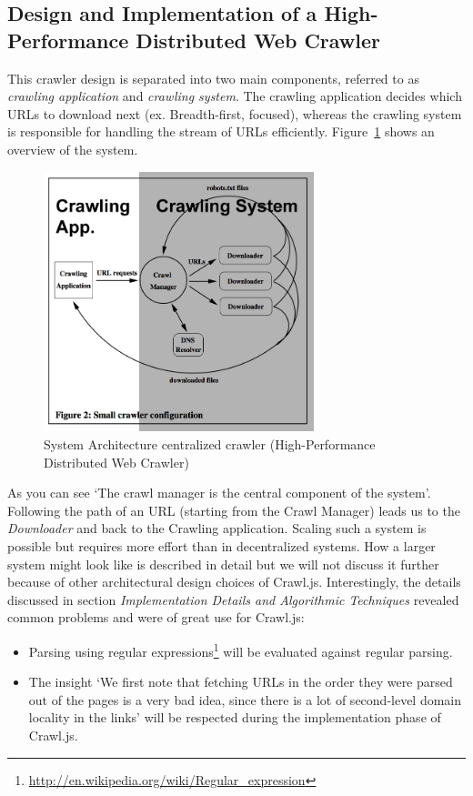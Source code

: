 \subsection{Design and Implementation of a High-Performance Distributed Web Crawler~\cite{hp_crawler}}
This crawler design is separated into two main components, referred to as \emph{crawling application} and \emph{crawling system}. The crawling application decides which URLs to download next (ex. Breadth-first, focused), whereas the crawling system is responsible for handling the stream of URLs efficiently. Figure~\ref{hp_crawler} shows an overview of the system.
\begin{figure}[h]
\centering
  \includegraphics[width=0.7\textwidth]{Figures/hp_crawler.png}
\caption{System Architecture centralized crawler (High-Performance Distributed Web Crawler)}
\label{hp_crawler}
\end{figure}
As you can see `The crawl manager is the central component of the system'. Following the path of an URL (starting from the Crawl Manager) leads us to the \emph{Downloader} and back to the Crawling application. Scaling such a system is possible but requires more effort than in decentralized systems. How a larger system might look like is described in detail but we will not discuss it further because of other architectural design choices of Crawl.js.
Interestingly, the details discussed in section \emph{Implementation Details and Algorithmic Techniques} revealed common problems and were of great use for Crawl.js:
\begin{itemize}
  \item Parsing using regular expressions\footnote{\url{http://en.wikipedia.org/wiki/Regular_expression}} will be evaluated against regular parsing.
  \item The insight `We first note that fetching URLs in the order they were parsed out of the pages is a very bad idea, since there is a lot of second-level domain locality in the links' will be respected during the implementation phase of Crawl.js.
\end{itemize}


